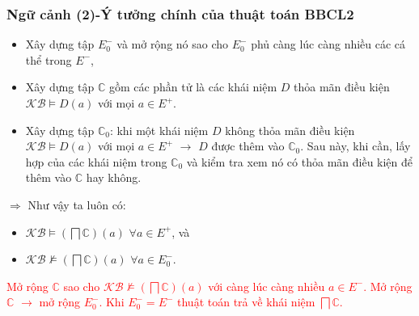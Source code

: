 \documentclass[notheorems,xcolor=dvipsnames]{beamer}
\newcommand{\mbC}		{\mathbb{C}}
\newcommand{\KB}		{\mathcal{KB}}
\newcommand{\BBCLearnS}		{BBCL2\xspace}
\newcommand{\V}			{\forall}
\begin{document}
\begin{frame}\frametitle{\bf Ngữ cảnh (2)-Ý tưởng chính của thuật toán \BBCLearnS}
	\vspace{-1.0ex}
	\begin{itemize}
		\setlength{\itemsep}{0.5ex}	
		
		\item Xây dựng tập $E^-_0$ và mở rộng nó sao cho $E^-_0$ phủ càng lúc càng nhiều các cá thể trong $E^-$,
				
		\item Xây dựng tập $\mbC$ gồm các phần tử là các khái niệm $D$ thỏa mãn điều kiện \mbox{$\KB \models D(a)$} với mọi $a \in E^+$.
		
		\item Xây dựng tập $\mbC_0$: khi một khái niệm $D$ không thỏa mãn điều kiện $\KB \models D(a)$ với mọi $a \in E^+$ $\rightarrow$ $D$ được thêm vào $\mbC_0$. Sau này, khi cần, lấy hợp của các khái niệm trong $\mbC_0$ và kiểm tra xem nó có thỏa mãn điều kiện để thêm vào $\mbC$ hay không.
	\end{itemize}
	$\Rightarrow$ Như vậy ta luôn có: 
	\begin{itemize}
		\item $\KB \models (\bigsqcap\mbC)(a)$ $\V a \in E^+$, và
		\item $\KB \not\models (\bigsqcap\mbC)(a)$ $\V a \in E^-_0$.
	\end{itemize}
	\vspace{1.0ex}
	\textcolor{red}{Mở rộng $\mbC$ sao cho $\KB \not\models(\bigsqcap\mbC)(a)$ với càng lúc càng nhiều $a \in E^-$. Mở rộng $\mbC$ $\rightarrow$ mở rộng $E^-_0$. Khi $E^-_0 = E^-$ thuật toán trả về khái niệm $\bigsqcap\mbC$.
		}
\end{frame}
\end{document}
